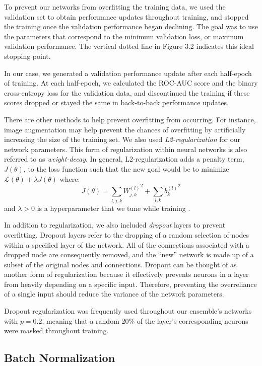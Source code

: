 \documentclass [MAS] {uclathes}
\begin{document}
To prevent our networks from overfitting the training data, we used the validation set to obtain performance updates throughout training, and stopped the training once the validation performance began declining. The goal was to use the parameters that correspond to the minimum validation loss, or maximum validation performance. The vertical dotted line in Figure 3.2 indicates this ideal stopping point. 

In our case, we generated a validation performance update after each half-epoch of training. At each half-epoch, we calculated the ROC-AUC score and the binary cross-entropy loss for the validation data, and discontinued the training if these scores dropped or stayed the same in back-to-back performance updates.

There are other methods to help prevent overfitting from occurring. For instance, image augmentation may help prevent the chances of overfitting by artificially increasing the size of the training set. We also used \textit{L2-regularization} for our network parameters. This form of regularization within neural networks is also referred to as \textit{weight-decay}. In general, L2-regularization adds a penalty term, $J(\theta)$, to the loss function such that the new goal would be to minimize $\mathcal{L}(\theta) + \lambda J(\theta)$ where: $$J(\theta) = \sum_{l, j, k} {W^{(l)}_{j, k}}^2 + \sum_{l, k} {b^{(l)}_{k}}^2$$ and $\lambda > 0$ is a hyperparameter that we tune while training \cite{ESL}. 

In addition to regularization, we also included \textit{dropout} layers to prevent overfitting. Dropout layers refer to the dropping of a random selection of nodes within a specified layer of the network. All of the connections associated with a dropped node are consequently removed, and the ``new'' network is made up of a subset of the original nodes and connections. Dropout can be thought of as another form of regularization because it effectively prevents neurons in a layer from heavily depending on a specific input. Therefore, preventing the overreliance of a single input should reduce the variance of the network parameters. 

Dropout regularization was frequently used throughout our ensemble's networks with $p = 0.2$, meaning that a random 20\% of the layer's corresponding neurons were masked throughout training. 


\subsection{Batch Normalization}
\end{document}
